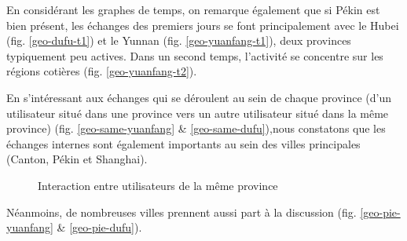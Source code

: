 En considérant les graphes de temps, on remarque également que si Pékin est bien présent, les échanges des premiers jours se font principalement avec le Hubei (fig. \ref{geo-dufu-t1}) et le Yunnan (fig. \ref{geo-yuanfang-t1}), deux provinces typiquement peu actives. Dans un second temps, l'activité se concentre sur les régions cotières (fig. \ref{geo-yuanfang-t2}).

En s{\textquoteright}intéressant aux échanges qui se déroulent au sein de chaque province (d{\textquoteright}un utilisateur situé dans une province vers un autre utilisateur situé dans la même province) (fig. \ref{geo-same-yuanfang} \& \ref{geo-same-dufu}),nous constatons que les échanges internes sont également importants au sein des villes principales (Canton, Pékin et Shanghai).

\begin{figure}[h!]
    \centering
    \caption{
        Interaction entre utilisateurs de la même province
    }
\end{figure}

Néanmoins, de nombreuses villes prennent aussi part \`a la discussion (fig. \ref{geo-pie-yuanfang} \& \ref{geo-pie-dufu}). 


